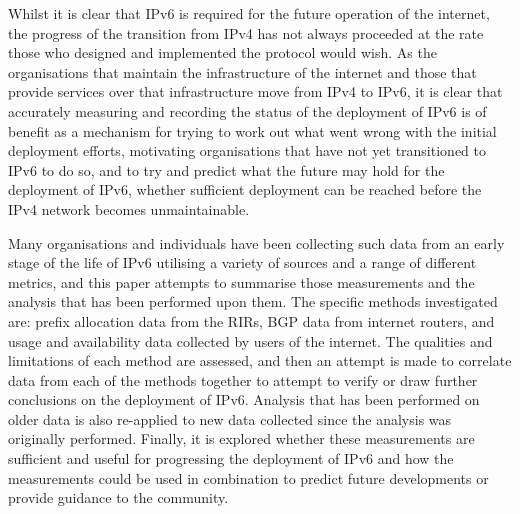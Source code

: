 Whilst it is clear that IPv6 is required for the future operation of the
internet\cite{huston_ipv6_2008}, the progress of the transition from IPv4  has not always proceeded
at the rate those who designed and implemented the protocol would wish. As the
organisations that maintain the infrastructure of the internet and those that
provide services over that infrastructure move from IPv4 to IPv6, it is clear
that accurately measuring and recording the status of the deployment of IPv6
is of benefit as a mechanism for trying to work out what went wrong with
the initial deployment efforts, motivating organisations that have not yet
transitioned to IPv6 to do so, and to try and predict what the future may hold
for the deployment of IPv6, whether sufficient deployment can be reached before
the IPv4 network becomes unmaintainable\cite{huston_primer_2013}.

Many organisations and individuals have been collecting such data from an
early stage of the life of IPv6 utilising a variety of sources and a range of
different metrics, and this paper attempts to summarise those measurements and
the analysis that has been performed upon them. The specific methods investigated
are: prefix allocation data from the RIRs, BGP data from internet routers, and
usage and availability data collected by users of the internet.
The qualities and limitations of each method are assessed, and then an attempt
is made to correlate data from each of the methods together to attempt to verify
or draw further conclusions on the deployment of IPv6. Analysis that has
been performed on older data is also re-applied to new data collected since the
analysis was originally performed. Finally, it is explored whether these
measurements are sufficient and useful for progressing
the deployment of IPv6 and how the measurements could be used in combination to
predict future developments or provide guidance to the community.

